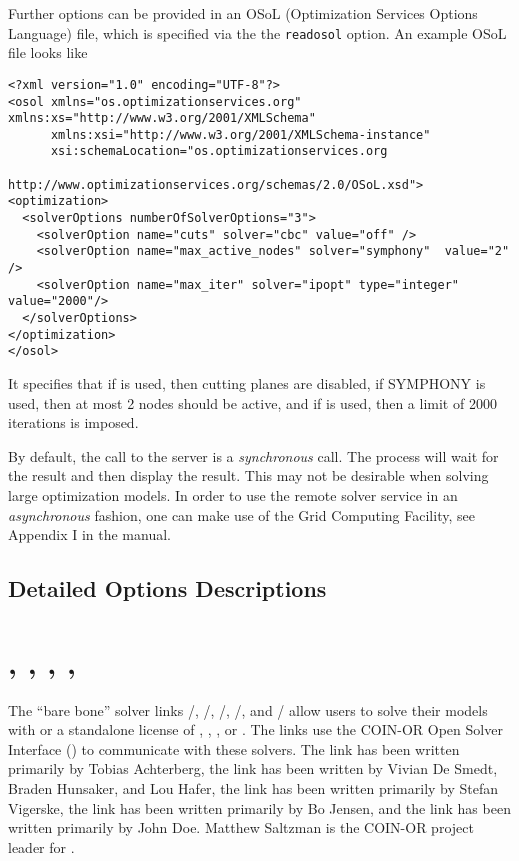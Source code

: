 Further options can be provided in an OSoL (Optimization Services Options Language) file, which is specified via the the \texttt{readosol} option.
An example OSoL file looks like
\begin{verbatim}
<?xml version="1.0" encoding="UTF-8"?>
<osol xmlns="os.optimizationservices.org" xmlns:xs="http://www.w3.org/2001/XMLSchema"
      xmlns:xsi="http://www.w3.org/2001/XMLSchema-instance"
      xsi:schemaLocation="os.optimizationservices.org
                          http://www.optimizationservices.org/schemas/2.0/OSoL.xsd">
<optimization>
  <solverOptions numberOfSolverOptions="3">
    <solverOption name="cuts" solver="cbc" value="off" />
    <solverOption name="max_active_nodes" solver="symphony"  value="2" />
    <solverOption name="max_iter" solver="ipopt" type="integer" value="2000"/>
  </solverOptions>
</optimization>
</osol>
\end{verbatim}
It specifies that if \CBC is used, then cutting planes are disabled,
if \textsc{SYMPHONY} is used, then at most 2 nodes should be active,
and if \IPOPT is used, then a limit of 2000 iterations is imposed.

By default, the call to the server is a \emph{synchronous} call.
The \GAMS process will wait for the result and then display the result.
This may not be desirable when solving large optimization models.
In order to use the remote solver service in an \emph{asynchronous} fashion, one can make use of the \GAMS Grid Computing Facility, see Appendix I in the \GAMS manual.

\subsection{Detailed Options Descriptions}



\section{\OSICPLEX, \OSIGLPK, \OSIGUROBI, \OSIMOSEK, \OSIXPRESS}

The ``bare bone'' solver links \GAMS/\OSICPLEX, \GAMS/\OSIGLPK, \GAMS/\OSIGUROBI, \GAMS/\OSIMOSEK, and \GAMS/\OSIXPRESS
allow users to solve their \GAMS models with \GLPK or a standalone license of \CPLEX, \GUROBI, \MOSEK, or \XPRESS.
The links use the COIN-OR Open Solver Interface (\OSI) to communicate with these solvers.
The \OSICPLEX link has been written primarily by Tobias Achterberg,
the \OSIGLPK link has been written by Vivian De Smedt, Braden Hunsaker, and Lou Hafer,
the \OSIGUROBI link has been written primarily by Stefan Vigerske,
the \OSIMOSEK link has been written primarily by Bo Jensen, and
the \OSIXPRESS link has been written primarily by John Doe.
Matthew Saltzman is the COIN-OR project leader for \OSI.

